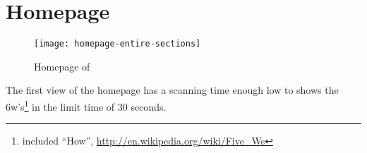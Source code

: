 \documentclass[
10pt, %
a4paper, %
oneside, %
headinclude,footinclude, %
BCOR5mm, %
]{scrartcl}
\begin{document}

\section{Homepage}
\label{homepage}

\begin{figure}[p]
\centering 
\centerline{\texttt{[image: homepage-entire-sections]}}
\caption[Homepage]{Homepage of \thesite{}}
\label{fig:homepage} 
\end{figure}

The first view of the homepage has a scanning time enough low to shows the 6w's\footnote{included ``How'', \url{http://en.wikipedia.org/wiki/Five_Ws}} in the limit time of 30 seconds.
\end{document}
